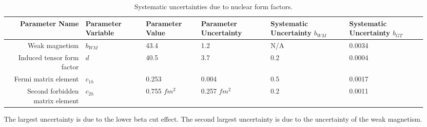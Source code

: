 \documentclass[../MaxHughesThesis.tex]{subfiles}
\begin{document}
\begin{table}[!hbt]
	\centering
	\caption{Systematic uncertainties due to nuclear form factors.} 
		\begin{tabularx}{\textwidth}{RLLLLL}
		Parameter Name & Parameter Variable & Parameter Value & Parameter Uncertainty & Systematic Uncertainty $b_{WM}$ & Systematic Uncertainty $b_{GT}$ \\ \hline
		Weak magnetism & $b_{WM}$ & 43.4 & 1.2 \cite{Min11} & N/A & 0.0034 \\
		Induced tensor form factor & $d$ & 40.5 &  3.7 \cite{Min11} & 0.2 & 0.0004 \\
		Fermi matrix element & $c_{1h}$ & 0.253 & 0.004 \cite{Min11} & 0.5  & 0.0017 \\
		Second forbidden matrix element & $c_{2h}$  & 0.755 $fm^{2}$ & 0.257 $fm^{2}$ \cite{Elm87} & 0.2 & 0.0011
		\end{tabularx}
		\label{tab:formfactorsyseffect}
\end{table}

The largest uncertainty is due to the lower beta cut effect.
The second largest uncertainty is due to the uncertainty of the weak magnetism.
\end{document}
